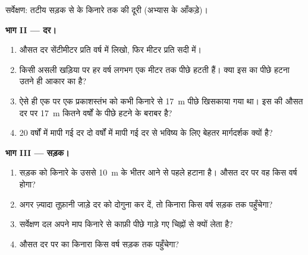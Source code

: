 \begin{problem}
\begin{omfigure}
{\small सर्वेक्षण: तटीय सड़क से  के किनारे तक की दूरी (अभ्यास के
आँकड़े)।}
\label{fig:g9:landforms:survey}
\end{omfigure}

\noindent\textbf{भाग II --- दर।}\par\nopagebreak
\begin{enumerate}[resume, beginpenalty=10000]
  \item औसत दर सेंटीमीटर प्रति वर्ष में लिखो, फिर मीटर प्रति
        सदी में।
  \item किसी असली खड़िया  पर  हर वर्ष लगभग एक मीटर तक पीछे हटती हैं। क्या इस
         का पीछे हटना उतने ही आकार का है?
  \item ऐसे ही एक  पर एक प्रकाशस्तंभ को कभी किनारे से \qty{17}{m} पीछे खिसकाया गया
        था। इस  की औसत दर पर \qty{17}{m} कितने वर्षों के पीछे हटने के बराबर
        है?
  \item 20 वर्षों में मापी गई दर दो वर्षों में मापी गई दर से भविष्य के लिए बेहतर मार्गदर्शक
        क्यों है?
\end{enumerate}

\noindent\textbf{भाग III --- सड़क।}\par\nopagebreak
\begin{enumerate}[resume, beginpenalty=10000]
  \item सड़क को किनारे के उससे \qty{10}{m} के भीतर आने से पहले हटाना है। औसत दर पर वह
        किस वर्ष होगा?
  \item अगर ज़्यादा तूफ़ानी जाड़े दर को दोगुना कर दें, तो किनारा किस वर्ष सड़क तक
        पहुँचेगा?
  \item सर्वेक्षण दल अपने माप किनारे से काफ़ी पीछे गाड़े गए चिह्नों से क्यों लेता है?
  \item औसत दर पर  का किनारा किस वर्ष सड़क तक
        पहुँचेगा?
\end{enumerate}
\end{problem}
